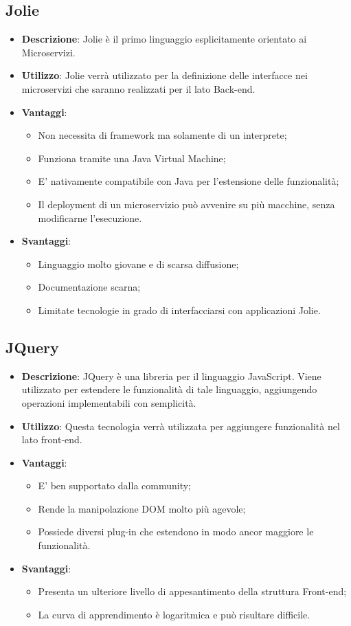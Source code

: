 \subsection{Jolie}
\begin{itemize}
	\item \textbf{Descrizione}: Jolie è il primo linguaggio esplicitamente orientato ai Microservizi. 
	\item \textbf{Utilizzo}: Jolie verrà utilizzato per la definizione delle interfacce nei microservizi che saranno realizzati per il lato Back-end.
	\item \textbf{Vantaggi}:
	\begin{itemize}
		\item Non necessita di framework ma solamente di un interprete;
		\item Funziona tramite una Java Virtual Machine;
		\item E' nativamente compatibile con Java per l'estensione delle funzionalità;
		\item Il deployment di un microservizio può avvenire su più macchine, senza modificarne l'esecuzione.
	\end{itemize}
	\item \textbf{Svantaggi}:
	\begin{itemize}
		\item Linguaggio molto giovane e di scarsa diffusione;
		\item Documentazione scarna;
		\item Limitate tecnologie in grado di interfacciarsi con applicazioni Jolie.
	\end{itemize}
\end{itemize}

\subsection{JQuery}
\begin{itemize}
	\item \textbf{Descrizione}: JQuery è una libreria per il linguaggio JavaScript. Viene utilizzato per estendere le funzionalità di tale linguaggio, aggiungendo operazioni implementabili con semplicità.
	\item \textbf{Utilizzo}: Questa tecnologia verrà utilizzata per aggiungere funzionalità nel lato front-end.
	\item \textbf{Vantaggi}:
	\begin{itemize}
		\item E' ben supportato dalla community;
		\item Rende la manipolazione DOM molto più agevole;
		\item Possiede diversi plug-in che estendono in modo ancor maggiore le funzionalità.
	\end{itemize}
	\item \textbf{Svantaggi}:
	\begin{itemize}
		\item Presenta un ulteriore livello di appesantimento della struttura Front-end;
		\item La curva di apprendimento è logaritmica e può risultare difficile.
	\end{itemize}
\end{itemize}

